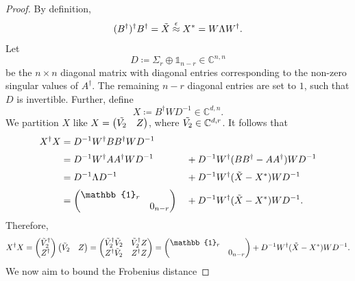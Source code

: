\begin{proof}
By definition,
\begin{equation*}
(B^{\dag})^{\dag}B^{\dag}=\Tilde{X}\stackrel{\epsilon}{\approx}X^*=W\Lambda W^{\dag}.
\end{equation*}
Let 
\begin{equation*}
D\coloneqq\Sigma_r\oplus\mathbb{1}_{n-r}\in\mathbb{C}^{n,n}
\end{equation*} be the $n\times n$ diagonal matrix with diagonal entries corresponding to the non-zero singular values of $A^{\dag}$. The remaining $n-r$ diagonal entries are set to $1$, such that $D$ is invertible. Further, define
\begin{equation*}
X\coloneqq B^{\dag} W D^{-1}\in\mathbb{C}^{d,n}.
\end{equation*}
We partition $X$ like $X=
\begin{pmatrix}
\Tilde{V_2} &  Z
\end{pmatrix}$, where $\Tilde{V_2}\in\mathbb{C}^{d,r}$.
It follows that
\begin{alignat*}{2}
X^{\dag}X & = D^{-1}W^{\dag}BB^{\dag}WD^{-1} && \\[0.2em]
& = D^{-1}W^{\dag}AA^{\dag}WD^{-1} && +D^{-1}W^{\dag}(BB^{\dag}-AA^{\dag})WD^{-1} \\[0.2em]
& = D^{-1}\Lambda D^{-1} && + D^{-1}W^{\dag}(\Tilde{X}-X^*)WD^{-1} \\[0.2em]
& =
\begin{pmatrix}
\mathbb{1}_r & \\
& 0_{n-r}
\end{pmatrix} && + D^{-1}W^{\dag}(\Tilde{X}-X^*)WD^{-1}.
\end{alignat*}
Therefore,
\begin{equation*}
X^{\dag}X=
\begin{pmatrix}
\Tilde{V}_2^{\dag}\\
Z^{\dag}
\end{pmatrix}
\begin{pmatrix}
\Tilde{V}_2 & Z
\end{pmatrix} =
\begin{pmatrix}
\Tilde{V}_2^{\dag}\Tilde{V}_2 & \Tilde{V}_2^{\dag} Z \\
Z^{\dag}\Tilde{V}_2 & Z^{\dag}Z
\end{pmatrix}
= 
\begin{pmatrix}
\mathbb{1}_r & \\
& 0_{n-r}
\end{pmatrix} + D^{-1}W^{\dag}(\Tilde{X}-X^*)WD^{-1}.
\end{equation*}
We now aim to bound the Frobenius distance

\end{proof}
